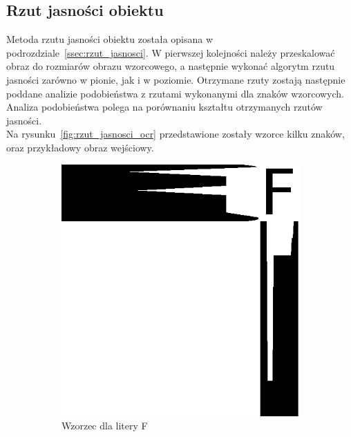 \subsection{Rzut jasności obiektu}
Metoda rzutu jasności obiektu została opisana w podrozdziale~\ref{ssec:rzut_jasnosci}. W pierwszej kolejności należy przeskalować obraz do rozmiarów obrazu wzorcowego, a następnie wykonać algorytm rzutu jasności zarówno w pionie, jak i w poziomie. Otrzymane rzuty zostają następnie poddane analizie podobieństwa z rzutami wykonanymi dla znaków wzorcowych. Analiza podobieństwa polega na porównaniu kształtu otrzymanych rzutów jasności. \\
Na rysunku~\ref{fig:rzut_jasnosci_ocr} przedstawione zostały wzorce kilku znaków, oraz przykładowy obraz wejściowy.

\begin{figure}
  \centering
  \begin{subfigure}[b]{0.42\textwidth}
    \includegraphics[width=\textwidth]{img/rzut-wzorzec-F}
    \caption{Wzorzec dla litery F}
    \label{fig:rzut_wzorzec_F}
  \end{subfigure}
  ~
  \begin{subfigure}[b]{0.42\textwidth}

\end{subfigure}
\end{figure}
